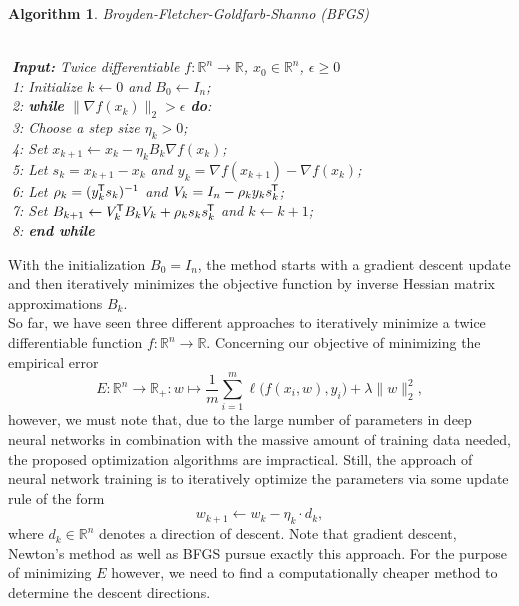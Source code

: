 \documentclass[11pt, a4paper]{article}
\newtheorem{algorithm}[theorem]{Algorithm}
\newcommand{\R}{\mathbb{R}}
\newcommand*{\tr}{^{\mkern-1.5mu\mathsf{T}}}
\begin{document}
\begin{algorithm}
\caption{Broyden-Fletcher-Goldfarb-Shanno (BFGS) \textcolor{white}{$\Big |$}} \ \\
\textcolor{white}{$\Big |$}\textbf{Input:} Twice differentiable $f: \R^n \to \R$, $x_0 \in \R^n$, $\epsilon \geq 0$ \\
\textcolor{white}{$\Big |$}1: Initialize $k \leftarrow 0$ and $B_0 \leftarrow I_n$; \\
\textcolor{white}{$\Big |$}2: \textbf{while} $ \big \| \nabla f(x_k) \big \|_2 > \epsilon $ \textbf{do}: \\
\textcolor{white}{$\Big |$}3: \quad Choose a step size $\eta_k > 0$; \\
\textcolor{white}{$\Big |$}4: \quad Set $x_{k+1} \leftarrow x_k - \eta_k B_k \nabla f(x_{k})$; \\
\textcolor{white}{$\Big |$}5: \quad Let $s_k = x_{k+1} - x_{k}$ and $y_k = \nabla f(x_{k+1}) - \nabla f(x_{k})$; \\
\textcolor{white}{$\Big |$}6: \quad Let $\rho_k = (y_k\tr s_k)^{-1}$ and $V_k = I_n - \rho_k y_k s_k\tr $; \\
\textcolor{white}{$\Big |$}7: \quad Set $B_{k+1} \leftarrow V_k\tr B_{k}V_k + \rho_k s_k s_k\tr $ and $k \leftarrow k+1$; \\
\textcolor{white}{$\Big |$}8: \textbf{end while}
\end{algorithm}

With the initialization $B_0 = I_n$, the method starts with a gradient descent update and then iteratively minimizes the objective function by inverse Hessian matrix approximations $B_k$. \\

So far, we have seen three different approaches to iteratively minimize a twice differentiable function $f: \R^n \to \R$. Concerning our objective of minimizing the empirical error
\[ E : \R^n \to \R_+ : w \mapsto \frac{1}{m} \sum_{i=1}^{m} \ell \big ( f(x_i,w),y_i \big) + \lambda \big \| w \big \|_2^2, \]
however, we must note that, due to the large number of parameters in deep neural networks in combination with the massive amount of training data needed, the proposed optimization algorithms are impractical. Still, the approach of neural network training is to iteratively optimize the parameters via some update rule of the form
\[ w_{k+1} \leftarrow w_k - \eta_k \cdot d_k, \]
where $d_k \in \R^n$ denotes a direction of descent. Note that gradient descent, Newton's method as well as BFGS pursue exactly this approach. For the purpose of minimizing $E$ however, we need to find a computationally cheaper method to determine the descent directions. \\
\end{document}
